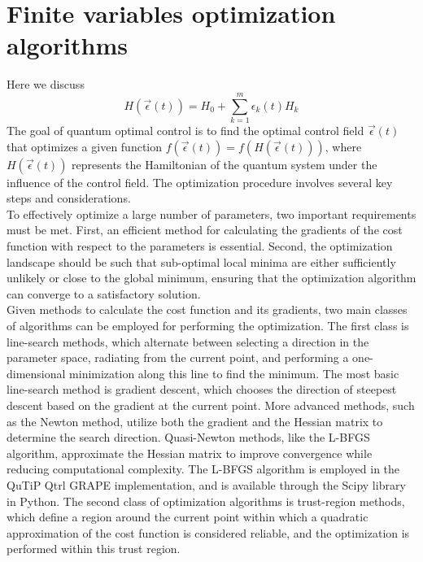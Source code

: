 \documentclass[12pt]{report}
\begin{document}
\section{Finite variables optimization algorithms}\label{sec:finite_variables_optimization}
Here we discuss 
\begin{equation}
    H(\vec{\epsilon}(t)) = H_0 + \sum_{k=1}^m \epsilon_k(t) H_k
\end{equation}
The goal of quantum optimal control is to find the optimal control field $\vec{\epsilon}(t)$ that optimizes a given function $f(\vec{\epsilon}(t)) = f(H(\vec{\epsilon}(t)))$, where $H(\vec{\epsilon}(t))$ represents the Hamiltonian of the quantum system under the influence of the control field. 
The optimization procedure involves several key steps and considerations.
\\
To effectively optimize a large number of parameters, two important requirements must be met. 
First, an efficient method for calculating the gradients of the cost function with respect to the parameters is essential. 
Second, the optimization landscape should be such that sub-optimal local minima are either sufficiently unlikely or close to the global minimum, ensuring that the optimization algorithm can converge to a satisfactory solution.
\\
Given methods to calculate the cost function and its gradients, two main classes of algorithms can be employed for performing the optimization. 
The first class is line-search methods, which alternate between selecting a direction in the parameter space, radiating from the current point, and performing a one-dimensional minimization along this line to find the minimum. 
The most basic line-search method is gradient descent, which chooses the direction of steepest descent based on the gradient at the current point. 
More advanced methods, such as the Newton method, utilize both the gradient and the Hessian matrix to determine the search direction. 
Quasi-Newton methods, like the L-BFGS algorithm, approximate the Hessian matrix to improve convergence while reducing computational complexity. 
The L-BFGS algorithm is employed in the QuTiP Qtrl GRAPE implementation, and is available through the Scipy library in Python.
The second class of optimization algorithms is trust-region methods, which define a region around the current point within which a quadratic approximation of the cost function is considered reliable, and the optimization is performed within this trust region.
\\
\end{document}
